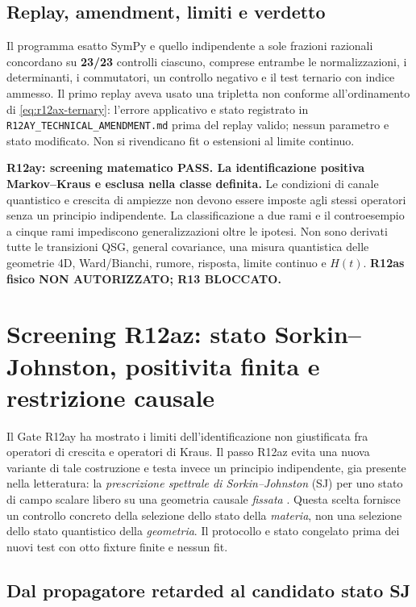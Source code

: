 \documentclass[11pt,a4paper]{article}
\begin{document}
\subsection{Replay, amendment, limiti e verdetto}
Il programma esatto SymPy e quello indipendente a sole frazioni razionali concordano su \textbf{23/23} controlli ciascuno, comprese entrambe le normalizzazioni, i determinanti, i commutatori, un controllo negativo e il test ternario con indice ammesso. Il primo replay aveva usato una tripletta non conforme all'ordinamento di \eqref{eq:r12ax-ternary}: l'errore applicativo e stato registrato in \texttt{R12AY\_TECHNICAL\_AMENDMENT.md} prima del replay valido; nessun parametro e stato modificato. Non si rivendicano fit o estensioni al limite continuo.

\textbf{R12ay: screening matematico PASS. La identificazione positiva Markov--Kraus e esclusa nella classe definita.} Le condizioni di canale quantistico e crescita di ampiezze non devono essere imposte agli stessi operatori senza un principio indipendente. La classificazione a due rami e il controesempio a cinque rami impediscono generalizzazioni oltre le ipotesi. Non sono derivati tutte le transizioni QSG, general covariance, una misura quantistica delle geometrie 4D, Ward/Bianchi, rumore, risposta, limite continuo e $H(t)$. \textbf{R12as fisico NON AUTORIZZATO; R13 BLOCCATO.}

\section{Screening R12az: stato Sorkin--Johnston, positivita finita e restrizione causale}
\label{sec:r12az}

Il Gate R12ay ha mostrato i limiti dell'identificazione non giustificata fra operatori di crescita e operatori di Kraus. Il passo R12az evita una nuova variante di tale costruzione e testa invece un principio indipendente, gia presente nella letteratura: la \emph{prescrizione spettrale di Sorkin--Johnston} (SJ) per uno stato di campo scalare libero su una geometria causale \emph{fissata} \cite{Johnston2009SJ,AfshordiAslanbeigiSorkin2012SJ,Surya2019Review}. Questa scelta fornisce un controllo concreto della selezione dello stato della \emph{materia}, non una selezione dello stato quantistico della \emph{geometria}. Il protocollo e stato congelato prima dei nuovi test con otto fixture finite e nessun fit.

\subsection{Dal propagatore retarded al candidato stato SJ}
\end{document}
